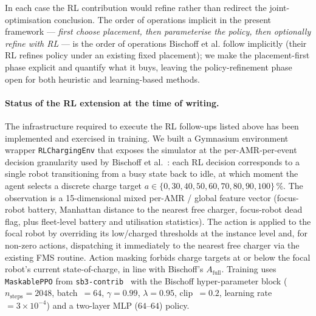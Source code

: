 \documentclass[conference]{IEEEtran}
\begin{document}
In each case the RL contribution would refine rather than redirect the joint-optimisation conclusion. The order of operations implicit in the present framework --- \emph{first choose placement, then parameterise the policy, then optionally refine with RL} --- is the order of operations Bischoff et al. follow implicitly (their RL refines policy under an existing fixed placement); we make the placement-first phase explicit and quantify what it buys, leaving the policy-refinement phase open for both heuristic and learning-based methods.

\paragraph{Status of the RL extension at the time of writing.}
The infrastructure required to execute the RL follow-ups listed above has been implemented and exercised in training. We built a Gymnasium environment wrapper \texttt{RLChargingEnv} that exposes the simulator at the per-AMR-per-event decision granularity used by Bischoff et al.~\cite{bischoff2025}: each RL decision corresponds to a single robot transitioning from a busy state back to idle, at which moment the agent selects a discrete charge target $a \in \{0, 30, 40, 50, 60, 70, 80, 90, 100\}\,\%$. The observation is a 15-dimensional mixed per-AMR / global feature vector (focus-robot battery, Manhattan distance to the nearest free charger, focus-robot dead flag, plus fleet-level battery and utilisation statistics). The action is applied to the focal robot by overriding its low/charged thresholds at the instance level and, for non-zero actions, dispatching it immediately to the nearest free charger via the existing FMS routine. Action masking forbids charge targets at or below the focal robot's current state-of-charge, in line with Bischoff's $A_\text{full}$. Training uses \texttt{MaskablePPO} from \texttt{sb3-contrib}~\cite{sb3contrib} with the Bischoff hyper-parameter block ($n_\text{steps}=2048$, batch~$=64$, $\gamma=0.99$, $\lambda=0.95$, clip~$=0.2$, learning rate~$=3\!\times\!10^{-4}$) and a two-layer MLP ($64$--$64$) policy.
\end{document}
